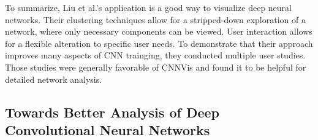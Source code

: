\documentclass{acmsiggraph}               %
\begin{document}
To summarize, Liu et al.'s application is a good way to visualize deep neural networks. Their clustering techniques allow for a stripped-down exploration of a network, where only necessary components can be viewed. User interaction allows for a flexible alteration to specific user needs. To demonstrate that their approach improves many aspects of CNN trainging, they conducted multiple user studies. Those studies were generally favorable of CNNVis and found it to be helpful for detailed network analysis.

\subsection{Towards Better Analysis of Deep Convolutional Neural Networks}




\nocite{*}

\end{document}
